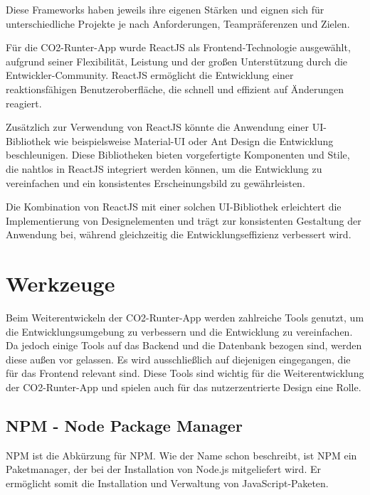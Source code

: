 
Diese Frameworks haben jeweils ihre eigenen Stärken und eignen sich für unterschiedliche Projekte je nach Anforderungen, Teampräferenzen und Zielen.\cite{angular-vuejs-reactjs-comparison:3, angular-vuejs-reactjs-comparison:4}

Für die CO2-Runter-App wurde ReactJS als Frontend-Technologie ausgewählt, aufgrund seiner Flexibilität, Leistung und der großen Unterstützung durch die Entwickler-Community. ReactJS ermöglicht die Entwicklung einer reaktionsfähigen Benutzeroberfläche, die schnell und effizient auf Änderungen reagiert.

Zusätzlich zur Verwendung von ReactJS könnte die Anwendung einer \acs{UI}-Bibliothek wie beispielsweise Material-UI oder Ant Design die Entwicklung beschleunigen. Diese Bibliotheken bieten vorgefertigte Komponenten und Stile, die nahtlos in ReactJS integriert werden können, um die Entwicklung zu vereinfachen und ein konsistentes Erscheinungsbild zu gewährleisten.

Die Kombination von ReactJS mit einer solchen \acs{UI}-Bibliothek erleichtert die Implementierung von Designelementen und trägt zur konsistenten Gestaltung der Anwendung bei, während gleichzeitig die Entwicklungseffizienz verbessert wird.

\section{Werkzeuge}
\label{chapter:3-werkzeuge}

Beim Weiterentwickeln der CO2-Runter-App werden zahlreiche Tools genutzt, um die Entwicklungsumgebung zu verbessern und die Entwicklung zu vereinfachen. Da jedoch einige Tools auf das Backend und die Datenbank bezogen sind, werden diese außen vor gelassen. Es wird ausschließlich auf diejenigen eingegangen, die für das Frontend relevant sind. Diese Tools sind wichtig für die Weiterentwicklung der CO2-Runter-App und spielen auch für das nutzerzentrierte Design eine Rolle.

\subsection{NPM - Node Package Manager}
\label{chapter:3-werkzeuge-npm}

\acs{NPM} ist die Abkürzung für \acf{NPM}. Wie der Name schon beschreibt, ist NPM ein Paketmanager, der bei der Installation von Node.js mitgeliefert wird. Er ermöglicht somit die Installation und Verwaltung von JavaScript-Paketen.

